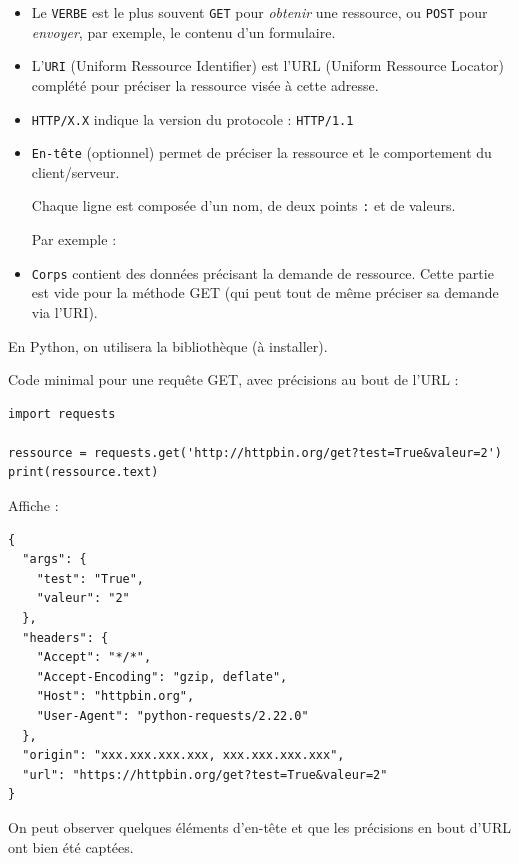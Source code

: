 \begin{itemize}
	\item Le \texttt{VERBE} est le plus souvent \texttt{GET} pour \emph{obtenir} une ressource, ou \texttt{POST} pour \emph{envoyer}, par exemple, le contenu d'un formulaire.
	\item L'\texttt{URI} (Uniform Ressource Identifier) est l'URL (Uniform Ressource Locator) complété pour préciser la ressource visée à cette adresse.
	\item \texttt{HTTP/X.X} indique la version du protocole : \texttt{HTTP/1.1}
	\item \texttt{En-tête} (optionnel) permet de préciser la ressource et le comportement du client/serveur.
	
	Chaque ligne est composée d'un nom, de deux points \texttt{:} et de valeurs.

    Par exemple : 
	\item \texttt{Corps} contient des données précisant la demande de ressource. Cette partie est vide pour la méthode GET (qui peut tout de même préciser sa demande via l'URI).
\end{itemize}

En Python, on utilisera la bibliothèque  (à installer).

Code minimal pour une requête GET, avec précisions au bout de l'URL :

\vspace{-2ex}
\begin{verbatim}
import requests

ressource = requests.get('http://httpbin.org/get?test=True&valeur=2')
print(ressource.text)
\end{verbatim}

Affiche :

\vspace{-2ex}
\begin{verbatim}
{
  "args": {
    "test": "True", 
    "valeur": "2"
  }, 
  "headers": {
    "Accept": "*/*", 
    "Accept-Encoding": "gzip, deflate", 
    "Host": "httpbin.org", 
    "User-Agent": "python-requests/2.22.0"
  }, 
  "origin": "xxx.xxx.xxx.xxx, xxx.xxx.xxx.xxx", 
  "url": "https://httpbin.org/get?test=True&valeur=2"
}
\end{verbatim}

On peut observer quelques éléments d'en-tête et que les précisions en bout d'URL ont bien été captées.

